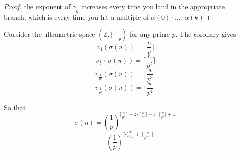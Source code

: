 \begin{proof}
the exponent of $\gamma_k$ increases every time you land in the appropriate branch, which is every time you hit a multiple of $\alpha(0)\cdot \ldots \cdot \alpha(k)$
\end{proof}

\begin{example}
Consider the ultrametric space $(\mathbb{Z}, \rvert \cdot \lvert_p)$  for any prime $p$. The corollary gives 
\[v_{1}(\sigma(n)) = \lceil\frac{n}{p}\rceil\]
\[v_{\frac{1}{p}}(\sigma(n)) = \lceil\frac{n}{p^2}\rceil\]
\[v_{\frac{1}{p^2}}(\sigma(n)) = \lceil\frac{n}{p^3}\rceil\]
\[v_{\frac{1}{p^3}}(\sigma(n)) = \lceil\frac{n}{p^4}\rceil\]

So that \[\sigma(n) = (\frac{1}{p})^ { \lceil\frac{n}{p^2}\rceil + 2 \cdot  \lceil\frac{n}{p^3}\rceil + 3 \cdot  \lceil\frac{n}{p^4}\rceil + \ldots}\]
\[ = (\frac{1}{p})^ { \sum_{i=1}^\infty i \cdot \lceil\frac{n}{p^{i+1}}\rceil }\]

\end{example}